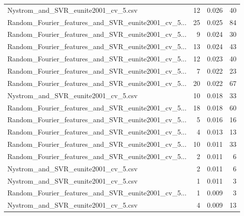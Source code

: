 \begin{tabularx}{\textwidth}{lrrr}
               Nystrom\_and\_SVR\_eunite2001\_cv\_5.csv &       12 &               0.026 &            40 \\
Random\_Fourier\_features\_and\_SVR\_eunite2001\_cv\_5... &       25 &               0.025 &            84 \\
Random\_Fourier\_features\_and\_SVR\_eunite2001\_cv\_5... &        9 &               0.024 &            30 \\
Random\_Fourier\_features\_and\_SVR\_eunite2001\_cv\_5... &       13 &               0.024 &            43 \\
Random\_Fourier\_features\_and\_SVR\_eunite2001\_cv\_5... &       12 &               0.023 &            40 \\
Random\_Fourier\_features\_and\_SVR\_eunite2001\_cv\_5... &        7 &               0.022 &            23 \\
Random\_Fourier\_features\_and\_SVR\_eunite2001\_cv\_5... &       20 &               0.022 &            67 \\
               Nystrom\_and\_SVR\_eunite2001\_cv\_5.csv &       10 &               0.018 &            33 \\
Random\_Fourier\_features\_and\_SVR\_eunite2001\_cv\_5... &       18 &               0.018 &            60 \\
Random\_Fourier\_features\_and\_SVR\_eunite2001\_cv\_5... &        5 &               0.016 &            16 \\
Random\_Fourier\_features\_and\_SVR\_eunite2001\_cv\_5... &        4 &               0.013 &            13 \\
Random\_Fourier\_features\_and\_SVR\_eunite2001\_cv\_5... &       10 &               0.011 &            33 \\
Random\_Fourier\_features\_and\_SVR\_eunite2001\_cv\_5... &        2 &               0.011 &             6 \\
               Nystrom\_and\_SVR\_eunite2001\_cv\_5.csv &        2 &               0.011 &             6 \\
               Nystrom\_and\_SVR\_eunite2001\_cv\_5.csv &        1 &               0.011 &             3 \\
Random\_Fourier\_features\_and\_SVR\_eunite2001\_cv\_5... &        1 &               0.009 &             3 \\
               Nystrom\_and\_SVR\_eunite2001\_cv\_5.csv &        4 &               0.009 &            13 \\
\bottomrule
\end{tabularx}
